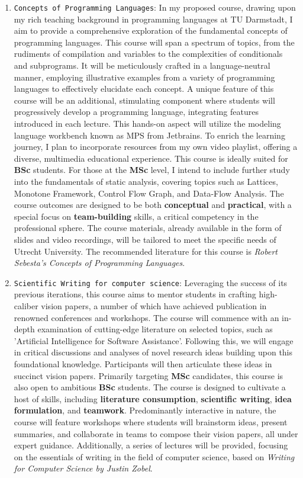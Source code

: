 \documentclass[12pt,a4paper,sans]{moderncv}
\begin{document}
\begin{enumerate}
    \item \texttt{Concepts of Programming Languages}: In my proposed course, drawing upon my rich teaching background in programming languages at TU Darmstadt, I aim to provide a comprehensive exploration of the fundamental concepts of programming languages. This course will span a spectrum of topics, from the rudiments of compilation and variables to the complexities of conditionals and subprograms. It will be meticulously crafted in a language-neutral manner, employing illustrative examples from a variety of programming languages to effectively elucidate each concept. A unique feature of this course will be an additional, stimulating component where students will progressively develop a programming language, integrating features introduced in each lecture. This hands-on aspect will utilize the modeling language workbench known as MPS from Jetbrains. To enrich the learning journey, I plan to incorporate resources from my own video playlist, offering a diverse, multimedia educational experience. This course is ideally suited for \textbf{BSc} students. For those at the \textbf{MSc} level, I intend to include further study into the fundamentals of static analysis, covering topics such as Lattices, Monotone Framework, Control Flow Graph, and Data-Flow Analysis. The course outcomes are designed to be both \textbf{conceptual} and \textbf{practical}, with a special focus on \textbf{team-building} skills, a critical competency in the professional sphere. The course materials, already available in the form of slides and video recordings, will be tailored to meet the specific needs of Utrecht University. The recommended literature for this course is \textit{Robert Sebesta's Concepts of Programming Languages}.
    \item \texttt{Scientific Writing for computer science}:  Leveraging the success of its previous iterations, this course aims to mentor students in crafting high-caliber vision papers, a number of which have achieved publication in renowned conferences and workshops. The course will commence with an in-depth examination of cutting-edge literature on selected topics, such as 'Artificial Intelligence for Software Assistance'. Following this, we will engage in critical discussions and analyses of novel research ideas building upon this foundational knowledge. Participants will then articulate these ideas in succinct vision papers. Primarily targeting \textbf{MSc} candidates, this course is also open to ambitious \textbf{BSc} students. The course is designed to cultivate a host of skills, including \textbf{literature consumption}, \textbf{scientific writing}, \textbf{idea formulation}, and \textbf{teamwork}. Predominantly interactive in nature, the course will feature workshops where students will brainstorm ideas, present summaries, and collaborate in teams to compose their vision papers, all under expert guidance. Additionally, a series of lectures will be provided, focusing on the essentials of writing in the field of computer science, based on \textit{Writing for Computer Science by Justin Zobel}.

\end{enumerate}
\end{document}
